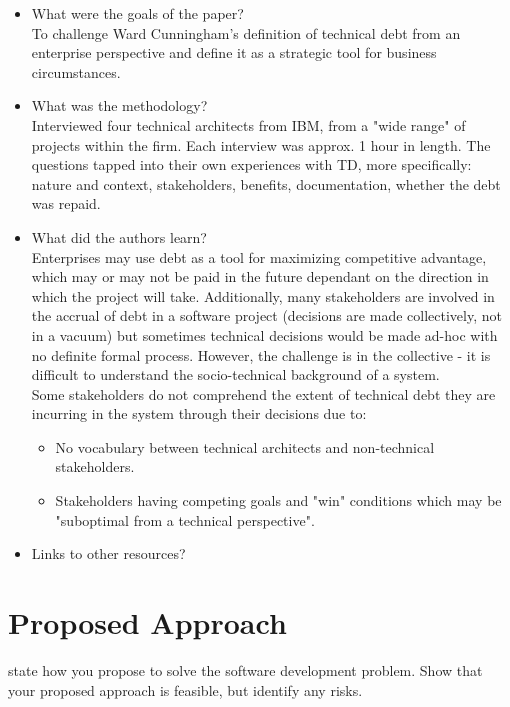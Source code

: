 \documentclass{mprop}
\begin{document}
\begin{itemize}
	\item What were the goals of the paper? \\
	      To challenge Ward Cunningham's definition of technical debt from an enterprise perspective and define it as a strategic tool for business circumstances.
	\item What was the methodology? \\
	      Interviewed four technical architects from IBM, from a "wide range" of projects within the firm. Each interview was approx. 1 hour in length.
	      The questions tapped into their own experiences with TD, more specifically: nature and context, stakeholders, benefits, documentation, whether the debt was repaid.
	\item What did the authors learn? \\
	      Enterprises may use debt as a tool for maximizing competitive advantage, which may or may not be paid in the future dependant on the direction in which the project will take.
	      Additionally, many stakeholders are involved in the accrual of debt in a software project (decisions are made collectively, not in a vacuum) but sometimes technical decisions would be made ad-hoc with no definite formal process.
	      However, the challenge is in the collective - it is difficult to understand the socio-technical background of a system. \\

	      Some stakeholders do not comprehend the extent of technical debt they are incurring in the system through their decisions due to:
	      \begin{itemize}
		      \item No vocabulary between technical architects and non-technical stakeholders.
		      \item Stakeholders having competing goals and "win" conditions which may be "suboptimal from a technical perspective".
	      \end{itemize}
	\item Links to other resources?
\end{itemize}

\section{Proposed Approach}

state how you propose to solve the software development problem. Show that your proposed approach is feasible, but identify any risks.
\end{document}
